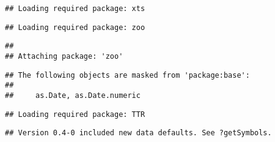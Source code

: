 \documentclass[a4paper]{article}
\begin{document}
\begin{verbatim}
## Loading required package: xts
\end{verbatim}

\begin{verbatim}
## Loading required package: zoo
\end{verbatim}

\begin{verbatim}
## 
## Attaching package: 'zoo'
\end{verbatim}

\begin{verbatim}
## The following objects are masked from 'package:base':
## 
##     as.Date, as.Date.numeric
\end{verbatim}

\begin{verbatim}
## Loading required package: TTR
\end{verbatim}

\begin{verbatim}
## Version 0.4-0 included new data defaults. See ?getSymbols.
\end{verbatim}
\end{document}
